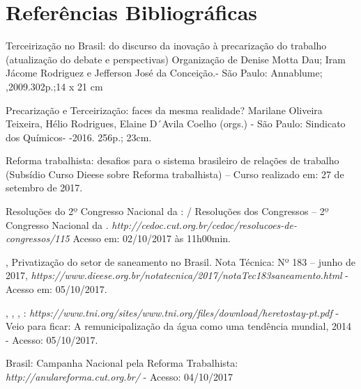 
\section{Referências Bibliográficas}

\begin{Parskip}
Terceirização no Brasil: do discurso da inovação à precarização do
trabalho (atualização do debate e perspectivas) Organização de Denise
Motta Dau; Iram Jácome Rodriguez e Jefferson José da Conceição.- São
Paulo: Annablume; ,2009.302p.;14 x 21 cm

Precarização e Terceirização: faces da mesma realidade? Marilane
Oliveira Teixeira, Hélio Rodrigues, Elaine D´Avila Coelho (orgs.) - São
Paulo: Sindicato dos Químicos- -2016. 256p.; 23cm.

 Reforma trabalhista: desafios para o sistema brasileiro de relações de
trabalho (Subsídio Curso Dieese sobre Reforma trabalhista) -- Curso
realizado em: 27 de setembro de 2017.

 Resoluções do 2º Congresso Nacional da : / Resoluções dos
Congressos -- 2º Congresso Nacional da .
\emph{http://cedoc.cut.org.br/cedoc/resolucoes-de-congressos/115}
Acesso em: 02/10/2017 às 11h00min.

 , Privatização do setor de saneamento no Brasil. Nota Técnica:
Nº 183 -- junho de 2017,
\emph{https://www.dieese.org.br/notatecnica/2017/notaTec183saneamento.html}
- Acesso em: 05/10/2017.

 ,   , ,  :
\emph{https://www.tni.org/sites/www.tni.org/files/download/heretostay-pt.pdf}
- Veio para ficar: A remunicipalização da água como uma tendência
mundial, 2014 - Acesso: 05/10/2017.

  Brasil: Campanha Nacional pela Reforma Trabalhista:
\emph{http://anulareforma.cut.org.br/}
- Acesso: 04/10/2017
\end{Parskip}